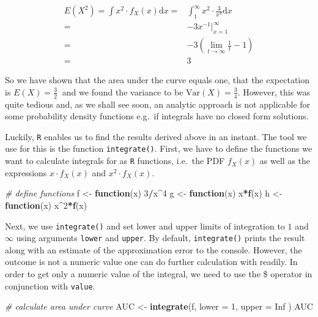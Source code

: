 \documentclass[]{book}
\newenvironment{Shaded}{\begin{snugshade}}{\end{snugshade}}
\newcommand{\KeywordTok}[1]{\textcolor[rgb]{0.13,0.29,0.53}{\textbf{#1}}}
\newcommand{\DataTypeTok}[1]{\textcolor[rgb]{0.13,0.29,0.53}{#1}}
\newcommand{\DecValTok}[1]{\textcolor[rgb]{0.00,0.00,0.81}{#1}}
\newcommand{\StringTok}[1]{\textcolor[rgb]{0.31,0.60,0.02}{#1}}
\newcommand{\CommentTok}[1]{\textcolor[rgb]{0.56,0.35,0.01}{\textit{#1}}}
\newcommand{\OtherTok}[1]{\textcolor[rgb]{0.56,0.35,0.01}{#1}}
\newcommand{\ControlFlowTok}[1]{\textcolor[rgb]{0.13,0.29,0.53}{\textbf{#1}}}
\newcommand{\OperatorTok}[1]{\textcolor[rgb]{0.81,0.36,0.00}{\textbf{#1}}}
\newcommand{\NormalTok}[1]{#1}
\theoremstyle{definition}
\theoremstyle{definition}
\theoremstyle{definition}
\theoremstyle{remark}
\begin{document}
\begin{align}
 E(X^2)= \int x^2 \cdot f_X(x) \mathrm{d}x =&  \int_{1}^{\infty} x^2 \cdot \frac{3}{x^4} \mathrm{d}x \\
  =& -3 x^{-1} \rvert_{x=1}^{\infty} \\
  =& -3 \left( \lim_{t \rightarrow \infty} \frac{1}{t} - 1 \right) \\
  =& 3
\end{align}

So we have shown that the area under the curve equals one, that the
expectation is \(E(X)=\frac{3}{2} \ \) and we found the variance to be
\(\text{Var}(X) = \frac{3}{4}\). However, this was quite tedious and, as
we shall see soon, an analytic approach is not applicable for some
probability density functions e.g.~if integrals have no closed form
solutions.

Luckily, \texttt{R} enables us to find the results derived above in an
instant. The tool we use for this is the function \texttt{integrate()}.
First, we have to define the functions we want to calculate integrals
for as \texttt{R} functions, i.e.~the PDF \(f_X(x)\) as well as the
expressions \(x\cdot f_X(x)\) and \(x^2\cdot f_X(x)\).

\begin{Shaded}
\begin{Highlighting}[]
\CommentTok{# define functions}
\NormalTok{f <-}\StringTok{ }\ControlFlowTok{function}\NormalTok{(x) }\DecValTok{3}\OperatorTok{/}\NormalTok{x}\OperatorTok{^}\DecValTok{4}
\NormalTok{g <-}\StringTok{ }\ControlFlowTok{function}\NormalTok{(x) x}\OperatorTok{*}\KeywordTok{f}\NormalTok{(x)}
\NormalTok{h <-}\StringTok{ }\ControlFlowTok{function}\NormalTok{(x) x}\OperatorTok{^}\DecValTok{2}\OperatorTok{*}\KeywordTok{f}\NormalTok{(x)}
\end{Highlighting}
\end{Shaded}

Next, we use \texttt{integrate()} and set lower and upper limits of
integration to \(1\) and \(\infty\) using arguments \texttt{lower} and
\texttt{upper}. By default, \texttt{integrate()} prints the result along
with an estimate of the approximation error to the console. However, the
outcome is not a numeric value one can do further calculation with
readily. In order to get only a numeric value of the integral, we need
to use the \$ operator in conjunction with \texttt{value}.

\begin{Shaded}
\begin{Highlighting}[]
\CommentTok{# calculate area under curve}
\NormalTok{AUC <-}\StringTok{ }\KeywordTok{integrate}\NormalTok{(f, }
                 \DataTypeTok{lower =} \DecValTok{1}\NormalTok{, }
                 \DataTypeTok{upper =} \OtherTok{Inf}
\NormalTok{                 )}
\NormalTok{AUC }
\end{Highlighting}
\end{Shaded}
\end{document}
